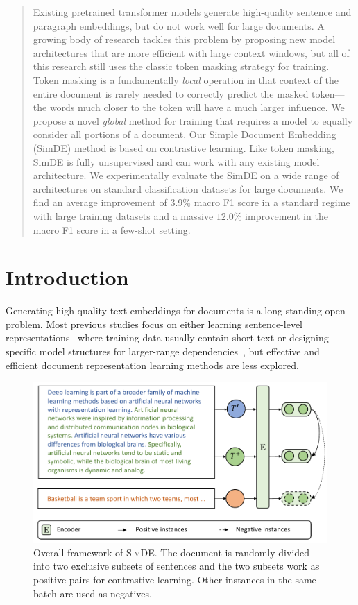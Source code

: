 \documentclass[11pt]{article}
\newcommand{\our}{\mbox{\textsc{SimDE}}}
\begin{document}
\begin{abstract}
Existing pretrained transformer models generate high-quality sentence and paragraph embeddings, but do not work well for large documents.
A growing body of research tackles this problem by proposing new model architectures that are more efficient with large context windows, but all of this research still uses the classic token masking strategy for training.
Token masking is a fundamentally \emph{local} operation in that context of the entire document is rarely needed to correctly predict the masked token---the words much closer to the token will have a much larger
influence.
We propose a novel \emph{global} method for training that requires a model to equally consider all portions of a document.
Our Simple Document Embedding (SimDE) method is based on contrastive learning.
Like token masking, SimDE is fully unsupervised and can work with any existing model architecture.
We experimentally evaluate the SimDE on a wide range of architectures on standard classification datasets for large documents.
We find an average improvement of $3.9\%$ macro F1 score in a standard
regime with large training datasets and a massive $12.0\%$ improvement in the macro F1 score in a few-shot setting.
\end{abstract}



\section{Introduction}

Generating high-quality text embeddings for documents is a long-standing open problem.
Most previous studies focus on either learning sentence-level representations~\cite{Hill2016LearningDR, Logeswaran2018AnEF, Gao2021SimCSESC} where training data usually contain short text or designing specific model structures for larger-range dependencies~\cite{Beltagy2020LongformerTL, Zaheer2020BigBT},
but effective and efficient document representation learning methods are less explored.

\begin{figure}[h]
\includegraphics[width=\columnwidth]{fig/simde.pdf}
\caption{Overall framework of \our. The document is randomly divided into two exclusive subsets of sentences and the two subsets work as positive pairs for contrastive learning. Other instances in the same batch are used as negatives.
}
\label{overall}
\end{figure}
\end{document}
